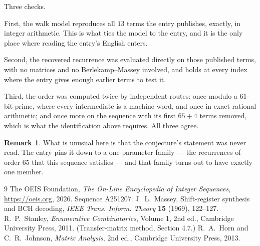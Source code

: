 \documentclass[11pt,a4paper]{article}
\theoremstyle{plain}
\theoremstyle{definition}
\newtheorem{remark}[theorem]{Remark}
\begin{document}
Three checks.

First, the walk model reproduces all $13$ terms the entry publishes, exactly, in integer
arithmetic. This is what ties the model to the entry, and it is the only place where reading
the entry's English enters.

Second, the recovered recurrence was evaluated directly on those published terms, with no
matrices and no Berlekamp--Massey involved, and holds at every index where the entry gives
enough earlier terms to test it.

Third, the order was computed twice by independent routes: once modulo a $61$-bit prime, where
every intermediate is a machine word, and once in exact rational arithmetic; and once more on
the sequence with its first $65+4$ terms removed, which is what the identification above
requires. All three agree.

\begin{remark}
What is unusual here is that the conjecture's statement was never read. The entry pins it down
to a one-parameter family --- the recurrences of order $65$ that this sequence satisfies
--- and that family turns out to have exactly one member.
\end{remark}

\begin{thebibliography}{9}
 The OEIS Foundation, \emph{The On-Line Encyclopedia of Integer
Sequences}, \url{https://oeis.org}, 2026. Sequence A251207.
 J.~L.~Massey, Shift-register synthesis and BCH decoding, \emph{IEEE
Trans. Inform. Theory} \textbf{15} (1969), 122--127.
 R.~P.~Stanley, \emph{Enumerative Combinatorics}, Volume 1, 2nd ed.,
Cambridge University Press, 2011. (Transfer-matrix method, Section 4.7.)
 R.~A.~Horn and C.~R.~Johnson, \emph{Matrix Analysis}, 2nd ed., Cambridge
University Press, 2013.
\end{thebibliography}
\end{document}
